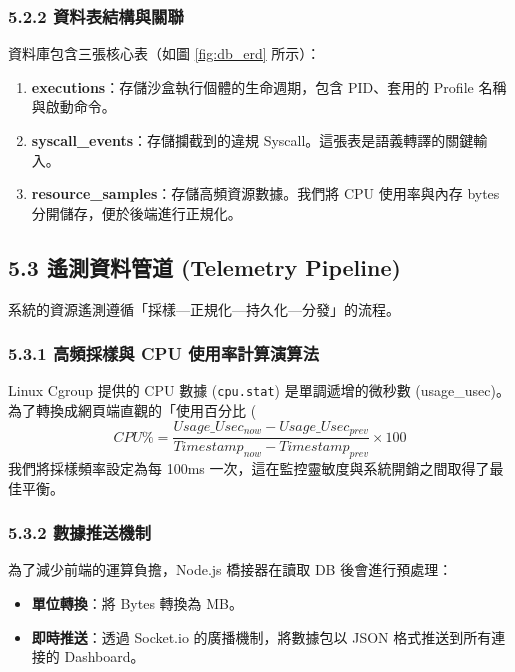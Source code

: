 \documentclass[12pt, a4paper, twoside]{article}
\begin{document}
\subsubsection{5.2.2 資料表結構與關聯}
資料庫包含三張核心表（如圖 \ref{fig:db_erd} 所示）：
\begin{enumerate}
    \item \textbf{executions}：存儲沙盒執行個體的生命週期，包含 PID、套用的 Profile 名稱與啟動命令。
    \item \textbf{syscall\_events}：存儲攔截到的違規 Syscall。這張表是語義轉譯的關鍵輸入。
    \item \textbf{resource\_samples}：存儲高頻資源數據。我們將 CPU 使用率與內存 bytes 分開儲存，便於後端進行正規化。
\end{enumerate}

\subsection{5.3 遙測資料管道 (Telemetry Pipeline)}
系統的資源遙測遵循「採樣—正規化—持久化—分發」的流程。

\subsubsection{5.3.1 高頻採樣與 CPU 使用率計算演算法}
Linux Cgroup 提供的 CPU 數據 (\texttt{cpu.stat}) 是單調遞增的微秒數 (usage\_usec)。為了轉換成網頁端直觀的「使用百分比 (%
\begin{equation}
    CPU\% = \frac{Usage\_Usec_{now} - Usage\_Usec_{prev}}{Timestamp_{now} - Timestamp_{prev}} \times 100
\end{equation}
我們將採樣頻率設定為每 100ms 一次，這在監控靈敏度與系統開銷之間取得了最佳平衡。

\subsubsection{5.3.2 數據推送機制}
為了減少前端的運算負擔，Node.js 橋接器在讀取 DB 後會進行預處理：
\begin{itemize}
    \item \textbf{單位轉換}：將 Bytes 轉換為 MB。
    \item \textbf{即時推送}：透過 Socket.io 的廣播機制，將數據包以 JSON 格式推送到所有連接的 Dashboard。
\end{itemize}
\end{document}
